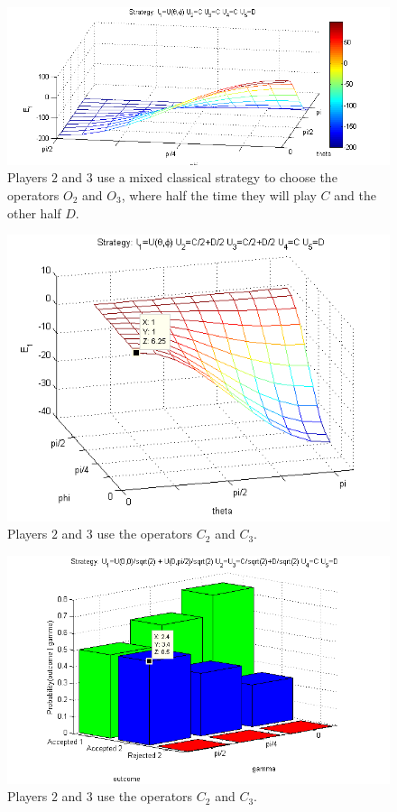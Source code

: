 \documentclass[10pt]{llncs}
\begin{document}
\begin{figure}[h!]
\centering 
\includegraphics[scale=0.50]{Figures/1.5qubit/meanpirategetscrewed.png}
\caption{Players $2$ and $3$ use a mixed classical strategy to choose the operators $O_{2}$ and $O_{3}$, where half the time they will play $C$ and the other half $D$. }
\label{fig:pg_3players_99_0_1:2}
\end{figure}

\begin{figure}[h!]
\centering 
\includegraphics[scale=0.50]{Figures/1.5qubit/mixedclassical.png}
\caption{Players $2$ and $3$ use the operators $C_{2}$ and $C_{3}$. }
\label{fig:pg_3players_99_0_1:2}
\end{figure}

\begin{figure}[h!]
\centering 
\includegraphics[scale=0.50]{Figures/1.5qubit/mixedmixedclassical.png}
\caption{Players $2$ and $3$ use the operators $C_{2}$ and $C_{3}$. }
\label{fig:pg_3players_99_0_1:2}
\end{figure}
\end{document}
